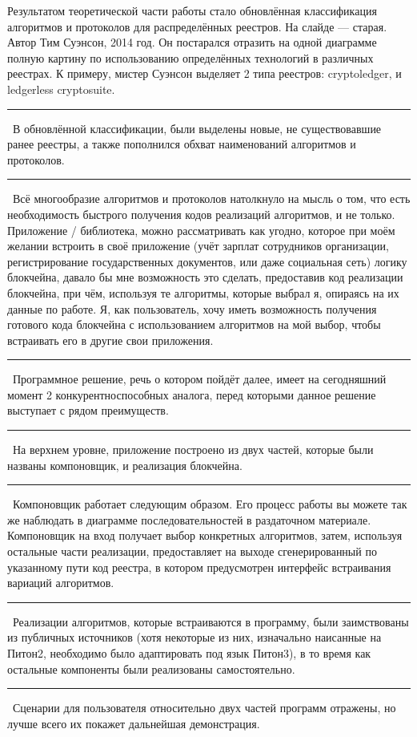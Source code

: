 \documentclass[12pt]{article}
\renewcommand{\line}{\noindent\rule{\textwidth}{1pt}}
\begin{document}
Результатом теоретической части работы стало обновлённая классификация
алгоритмов и протоколов для распределённых реестров. На слайде --- старая.
Автор Тим Суэнсон, 2014 год. Он постарался отразить на одной диаграмме полную
картину по использованию определённых технологий в различных реестрах. К
примеру, мистер Суэнсон выделяет 2 типа реестров: cryptoledger, и ledgerless
cryptosuite.\\
\line\
В обновлённой классификации, были выделены новые, не существовавшие ранее
реестры, а также пополнился обхват наименований алгоритмов и протоколов.\\
\line\
Всё многообразие алгоритмов и протоколов натолкнуло на мысль о том, что есть
необходимость быстрого получения кодов реализаций алгоритмов, и не только.
Приложение / библиотека, можно рассматривать как угодно, которое при моём
желании встроить в своё приложение (учёт зарплат сотрудников организации,
регистрирование государственных документов, или даже социальная сеть) логику
блокчейна, давало бы мне возможность это сделать, предоставив код реализации
блокчейна, при чём, используя те алгоритмы, которые выбрал я, опираясь на их
данные по работе. Я, как пользователь, хочу иметь возможность получения
готового кода блокчейна с использованием алгоритмов на мой выбор, чтобы
встраивать его в другие свои приложения.
\line\
Программное решение, речь о котором пойдёт далее, имеет на сегодняшний момент 2
конкурентноспособных аналога, перед которыми данное решение выступает с рядом
преимуществ.\\
\line\
На верхнем уровне, приложение построено из двух частей, которые были названы
компоновщик, и реализация блокчейна.\\
\line\
Компоновщик работает следующим образом. Его процесс работы вы можете так же
наблюдать в диаграмме последовательностей в раздаточном материале. Компоновщик
на вход получает выбор конкретных алгоритмов, затем, используя остальные части
реализации, предоставляет на выходе сгенерированный по указанному пути код
реестра, в котором предусмотрен интерфейс встраивания вариаций алгоритмов.\\
\line\
Реализации алгоритмов, которые встраиваются в программу, были заимствованы из
публичных источников (хотя некоторые из них, изначально наисанные на Питон2,
необходимо было адаптировать под язык Питон3), в то время как остальные
компоненты были реализованы самостоятельно.\\
\line\
Сценарии для пользователя относительно двух частей программ отражены, но лучше
всего их покажет дальнейшая демонстрация.\\
\end{document}
